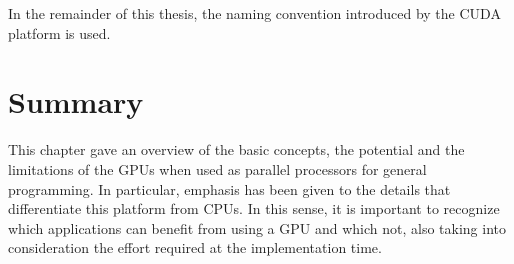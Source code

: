 In the remainder of this thesis, the naming convention introduced
by the CUDA platform is used.


\section{Summary}

This chapter gave an overview of the basic concepts, the potential
and the limitations of the GPUs when used as parallel processors for
general programming. In particular, emphasis has been given to the
details that differentiate this platform from CPUs. In this sense,
it is important to recognize which applications can benefit from using
a GPU and which not, also taking into consideration the effort required
at the implementation time.
